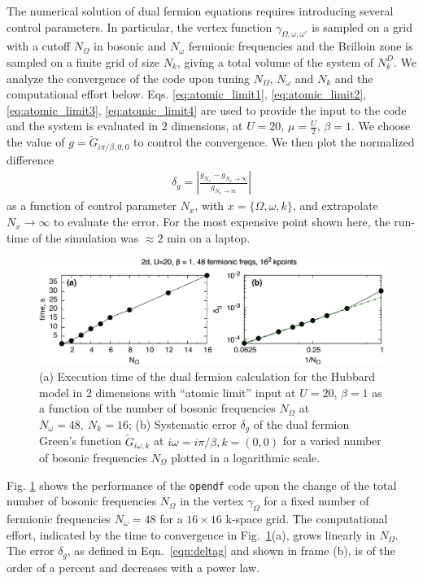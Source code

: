 \documentclass[3p,times,procedia]{elsarticle}
\begin{document}
The numerical solution of dual fermion equations requires introducing several control parameters. In particular,
the vertex function $\gamma_{\Omega,\omega,\omega'}$ is sampled on a grid with a cutoff $N_\Omega$ in bosonic and $N_{\omega}$ fermionic frequencies and the Brilloin zone is sampled on a finite grid of size $N_k$, giving a total volume of the system of $N_k^D$. We analyze the convergence of the code upon tuning $N_{\Omega}$, $N_{\omega}$ and $N_k$ and the computational effort below. Eqs. \ref{eq:atomic_limit1}, \ref{eq:atomic_limit2}, \ref{eq:atomic_limit3}, \ref{eq:atomic_limit4} are used to provide the input to the code and the system is evaluated in $2$ dimensions, at $U=20$, $\mu = \frac{U}{2}$, $\beta = 1$. We choose the value of $g= \tilde G_{i\pi / \beta, 0, 0}$ to control the convergence. We then plot the normalized difference 
\begin{align}\label{eqn:deltag}
\delta_{g} = \left|\frac{g_{N_x} - g_{N_x \to \infty}}{g_{N_x \to \infty}}\right|
\end{align}
 as a function of control parameter $N_x$, with $x = \{ \Omega, \omega, k \}$, and extrapolate  $N_x \to \infty$ 
to evaluate the error. For the most expensive point shown here, the run-time of the simulation was $\approx 2$ min on a laptop.

\begin{figure}[ht]
\includegraphics[width=1.0\columnwidth]{time_bfreqs.pdf}
\caption{(a) Execution time of the dual fermion calculation for the Hubbard model in $2$ dimensions with ``atomic limit'' input at $U=20$, $\beta = 1$ as a function of the number of bosonic frequencies $N_{\Omega}$ at $N_{\omega} = 48,~N_k = 16$; (b) Systematic error $\delta_g$ of the dual fermion Green's function $\tilde G_{i\omega, k}$ at $i\omega = i\pi / \beta, k = (0,0)$ for a varied number of bosonic frequencies $N_\Omega$ plotted in a logarithmic scale. }
\label{fig:benchmark_b}
\end{figure}

Fig. \ref{fig:benchmark_b} shows the performance of the \texttt{opendf} code upon the change of the total number of bosonic frequencies $N_{\Omega}$ in the vertex $\gamma_{\Omega}$ for a fixed number of fermionic frequencies $N_{\omega}=48$ for a $16 \times 16$ k-space grid. The computational effort, indicated by the time to convergence in Fig.~\ref{fig:benchmark_b}(a), grows linearly in $N_{\Omega}$. The error $\delta_g$, as defined in Eqn.~\ref{eqn:deltag} and shown in frame (b), is of the order of a percent and decreases with a power law.
\end{document}
